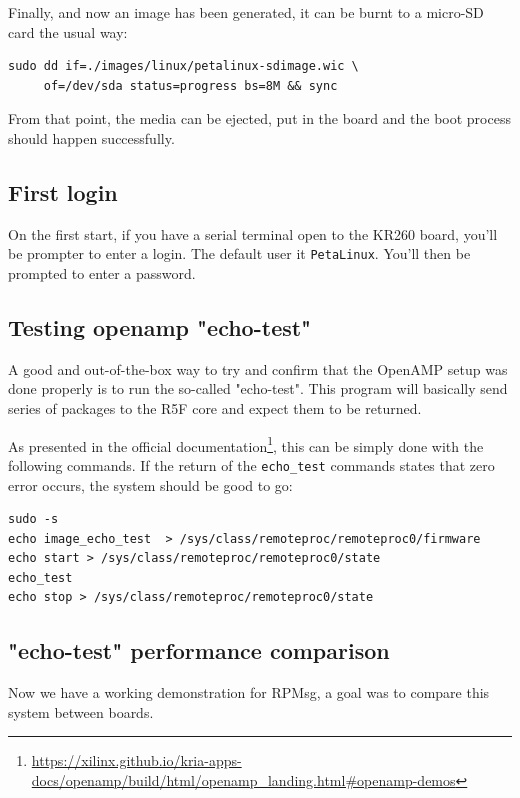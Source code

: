 \documentclass[10pt]{article}
\begin{document}
Finally, and now an image has been generated, it can be burnt to a micro-SD card the usual way:
\begin{verbatim}
sudo dd if=./images/linux/petalinux-sdimage.wic \
     of=/dev/sda status=progress bs=8M && sync
\end{verbatim}

From that point, the media can be ejected, put in the board and the boot process
should happen successfully.

\subsection{First login}
\label{sec:org35156c4}
On the first start, if you have a serial terminal open to the KR260 board, you'll be prompter to enter a login.
The default user it \texttt{PetaLinux}. You'll then be prompted to enter a password.

\subsection{Testing openamp "echo-test"}
\label{sec:org9c1eb2b}
A good and out-of-the-box way to try and confirm that the OpenAMP setup was done
properly is to run the so-called "echo-test". This program will basically send
series of packages to the R5F core and expect them to be returned.

As presented in the official documentation\footnote{\url{https://xilinx.github.io/kria-apps-docs/openamp/build/html/openamp\_landing.html\#openamp-demos}}, this can be simply done with
the following commands. If the return of the \texttt{echo\_test} commands states that zero
error occurs, the system should be good to go:
\begin{verbatim}
sudo -s
echo image_echo_test  > /sys/class/remoteproc/remoteproc0/firmware
echo start > /sys/class/remoteproc/remoteproc0/state
echo_test
echo stop > /sys/class/remoteproc/remoteproc0/state
\end{verbatim}

\subsection{"echo-test" performance comparison}
\label{sec:org54c327a}

Now we have a working demonstration for RPMsg, a goal was to compare this system between boards.
\end{document}
